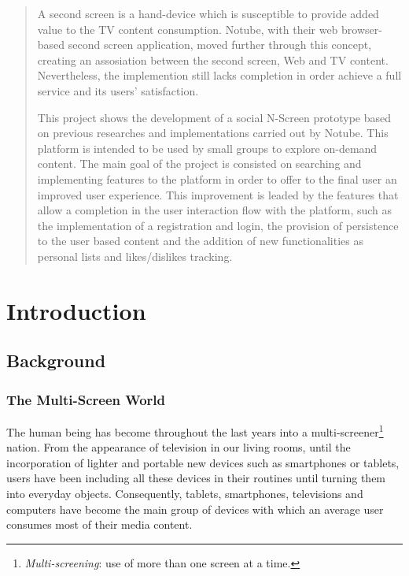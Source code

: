 \documentclass{acm_proc_article-sp}
\begin{document}
\maketitle
\begin{abstract}
A second screen is a hand-device which is susceptible to provide added value to the TV content consumption. Notube, with their web browser-based second screen application, moved further through this concept, creating an assosiation between the second screen, Web and TV content. Nevertheless, the implemention still lacks completion in order achieve a full service and its users' satisfaction.

This project shows the development of a social N-Screen prototype based on previous researches and implementations carried out by Notube. This platform is intended to be used by small groups to explore on-demand content. The main goal of the project is consisted on searching and implementing features to the platform in order to offer to the final user an improved user experience. This improvement is leaded by the features that allow a completion in the user interaction flow with the platform, such as the implementation of a registration and login, the provision of persistence to the user based content and the addition of new functionalities as personal lists and likes/dislikes tracking.
\end{abstract}

\section{Introduction}

\subsection{Background}

\subsubsection{The Multi-Screen World}

The human being has become throughout the last years into a multi-screener\footnote{\textit{Multi-screening}: use of 
more than one screen at a time.} nation. From the appearance of television in our living rooms, until the incorporation of lighter and portable new devices such as smartphones or tablets, users have been including all these devices in their routines until turning them into everyday objects. Consequently, tablets, smartphones, televisions and computers have become the main group of devices with which an average user consumes most of their media content\cite{multiscreen:google}. 
\end{document}
